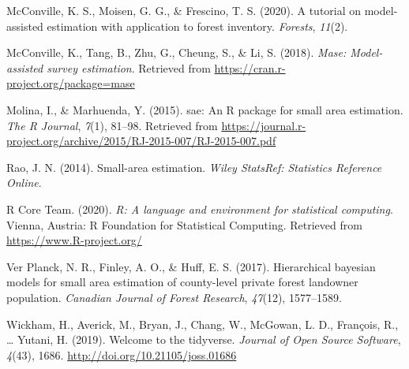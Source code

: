 \documentclass[12pt,twoside]{reedthesis}
\begin{document}
\leavevmode\hypertarget{ref-mcconville2020}{}%
McConville, K. S., Moisen, G. G., \& Frescino, T. S. (2020). A tutorial on model-assisted estimation with application to forest inventory. \emph{Forests}, \emph{11}(2).

\leavevmode\hypertarget{ref-mase}{}%
McConville, K., Tang, B., Zhu, G., Cheung, S., \& Li, S. (2018). \emph{Mase: Model-assisted survey estimation}. Retrieved from \url{https://cran.r-project.org/package=mase}

\leavevmode\hypertarget{ref-sae-package}{}%
Molina, I., \& Marhuenda, Y. (2015). sae: An R package for small area estimation. \emph{The R Journal}, \emph{7}(1), 81--98. Retrieved from \url{https://journal.r-project.org/archive/2015/RJ-2015-007/RJ-2015-007.pdf}

\leavevmode\hypertarget{ref-rao2014}{}%
Rao, J. N. (2014). Small-area estimation. \emph{Wiley StatsRef: Statistics Reference Online}.

\leavevmode\hypertarget{ref-r-software}{}%
R Core Team. (2020). \emph{R: A language and environment for statistical computing}. Vienna, Austria: R Foundation for Statistical Computing. Retrieved from \url{https://www.R-project.org/}

\leavevmode\hypertarget{ref-ver2017}{}%
Ver Planck, N. R., Finley, A. O., \& Huff, E. S. (2017). Hierarchical bayesian models for small area estimation of county-level private forest landowner population. \emph{Canadian Journal of Forest Research}, \emph{47}(12), 1577--1589.

\leavevmode\hypertarget{ref-tidyverse}{}%
Wickham, H., Averick, M., Bryan, J., Chang, W., McGowan, L. D., François, R., \ldots{} Yutani, H. (2019). Welcome to the tidyverse. \emph{Journal of Open Source Software}, \emph{4}(43), 1686. \url{http://doi.org/10.21105/joss.01686}


\end{document}
